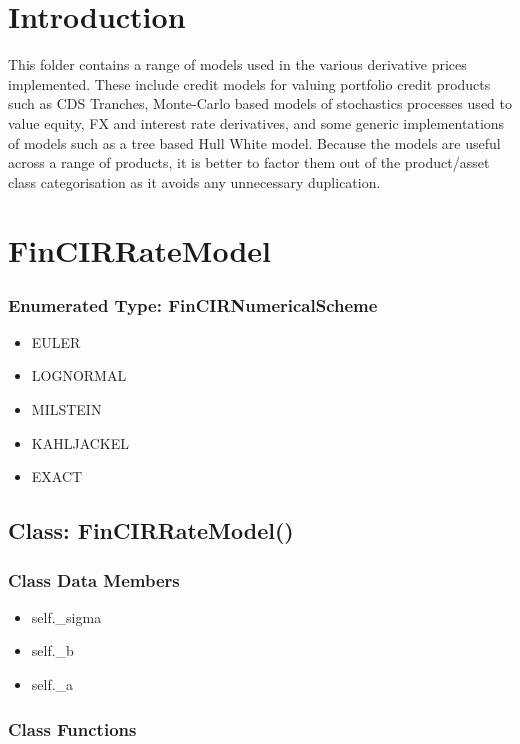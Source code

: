 \documentclass[twoside,11pt]{book}
\begin{document}
\section{Introduction}
This folder contains a range of models used in the various derivative prices implemented. These include credit models for valuing portfolio credit products such as CDS Tranches, Monte-Carlo based models of stochastics processes used to value equity, FX and interest rate derivatives, and some generic implementations of models such as a tree based Hull White model. Because the models are useful across a range of products, it is better to factor them out of the product/asset class categorisation as it avoids any unnecessary duplication.

\newpage
\section{FinCIRRateModel}

\subsubsection{Enumerated Type: FinCIRNumericalScheme}
\begin{itemize}
\item{EULER}
\item{LOGNORMAL}
\item{MILSTEIN}
\item{KAHLJACKEL}
\item{EXACT}
\end{itemize}

\subsection{Class: FinCIRRateModel()}


\subsubsection{Class Data Members}
\begin{itemize}
\item{self.\_sigma}
\item{self.\_b}
\item{self.\_a}
\end{itemize}

\subsubsection{Class Functions}
\end{document}
